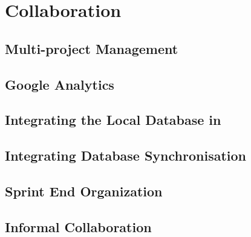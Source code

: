 \chapter{Collaboration}\label{chap:collaboration}
\section{Multi-project Management}\label{sec:collab:multiproject}


\section{Google Analytics}


\section{Integrating the Local Database in \launcher}\label{sec:collab:localdbtolauncher}


\section{Integrating Database Synchronisation}\label{sec:collab:remotedb}


\section{Sprint End Organization}\label{sec:collab:sprintend}


\section{Informal Collaboration}\label{sec:collab:adhoc}

